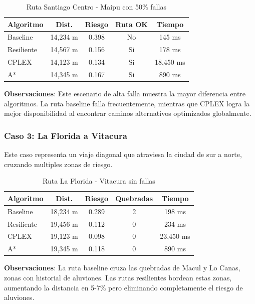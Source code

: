 \documentclass[conference]{IEEEtran}
\begin{document}
\begin{table}[!t]
\centering
\caption{Ruta Santiago Centro - Maipu con 50\% fallas}
\begin{tabular}{@{}lcccc@{}}
\toprule
\textbf{Algoritmo} & \textbf{Dist.} & \textbf{Riesgo} & \textbf{Ruta OK} & \textbf{Tiempo} \\
\midrule
Baseline & 14,234 m & 0.398 & No & 145 ms \\
Resiliente & 14,567 m & 0.156 & Si & 178 ms \\
CPLEX & 14,123 m & 0.134 & Si & 18,450 ms \\
A* & 14,345 m & 0.167 & Si & 890 ms \\
\bottomrule
\end{tabular}
\end{table}

\textbf{Observaciones}: Este escenario de alta falla muestra la mayor diferencia entre algoritmos. La ruta baseline falla frecuentemente, mientras que CPLEX logra la mejor disponibilidad al encontrar caminos alternativos optimizados globalmente.

\subsubsection{Caso 3: La Florida a Vitacura}

Este caso representa un viaje diagonal que atraviesa la ciudad de sur a norte, cruzando multiples zonas de riesgo.

\begin{table}[!t]
\centering
\caption{Ruta La Florida - Vitacura sin fallas}
\begin{tabular}{@{}lcccc@{}}
\toprule
\textbf{Algoritmo} & \textbf{Dist.} & \textbf{Riesgo} & \textbf{Quebradas} & \textbf{Tiempo} \\
\midrule
Baseline & 18,234 m & 0.289 & 2 & 198 ms \\
Resiliente & 19,456 m & 0.112 & 0 & 234 ms \\
CPLEX & 19,123 m & 0.098 & 0 & 23,450 ms \\
A* & 19,345 m & 0.118 & 0 & 890 ms \\
\bottomrule
\end{tabular}
\end{table}

\textbf{Observaciones}: La ruta baseline cruza las quebradas de Macul y Lo Canas, zonas con historial de aluviones. Las rutas resilientes bordean estas zonas, aumentando la distancia en 5-7\% pero eliminando completamente el riesgo de aluviones.
\end{document}
